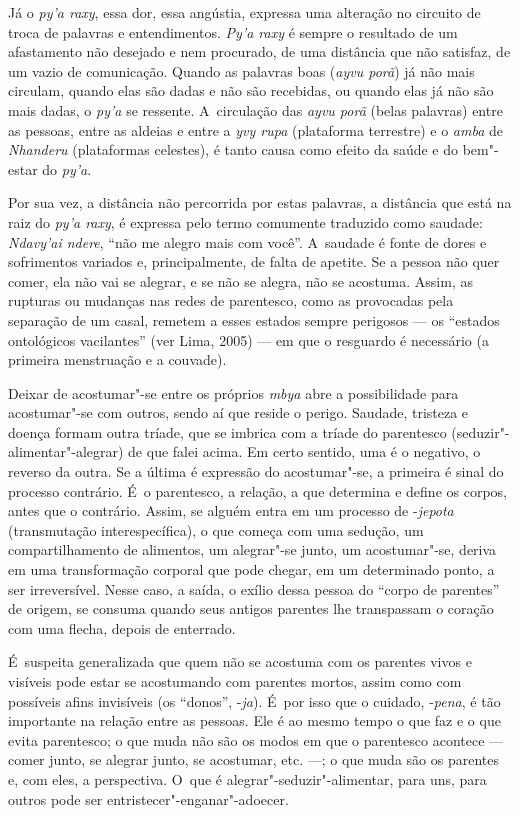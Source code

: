 Já o \emph{py’a raxy}, essa dor, essa angústia, expressa uma alteração no
circuito de troca de palavras e entendimentos. \emph{Py’a raxy} é sempre o
resultado de um afastamento não desejado e nem procurado, de uma
distância que não satisfaz, de um vazio de comunicação. Quando as
palavras boas (\emph{ayvu porã}) já não mais circulam, quando elas são dadas e
não são recebidas, ou quando elas já não são mais dadas, o \emph{py’a} se
ressente. A~circulação das \emph{ayvu porã} (belas palavras) entre as pessoas,
entre as aldeias e entre a \emph{yvy rupa} (plataforma terrestre) e o \emph{amba} de
\emph{Nhanderu} (plataformas celestes), é tanto causa como efeito da saúde e
do bem"-estar do \emph{py’a}.

Por sua vez, a distância não percorrida por estas palavras, a distância
que está na raiz do \emph{py’a raxy}, é expressa pelo termo comumente
traduzido como saudade: \emph{Ndavy’ai ndere}, ``não me alegro mais com
você''. A~saudade é fonte de dores e sofrimentos variados e,
principalmente, de falta de apetite. Se a pessoa não quer comer, ela
não vai se alegrar, e se não se alegra, não se acostuma. Assim, as
rupturas ou mudanças nas redes de parentesco, como as provocadas pela
separação de um casal, remetem a esses estados sempre perigosos --- os
``estados ontológicos vacilantes'' (ver Lima, 2005) --- em que o resguardo
é necessário (a primeira menstruação e a couvade). 

Deixar de acostumar"-se entre os próprios \emph{mbya} abre a possibilidade para
acostumar"-se com outros, sendo aí que reside o perigo. Saudade,
tristeza e doença formam outra tríade, que se imbrica com a tríade do
parentesco (seduzir"-alimentar"-alegrar) de que falei acima. Em certo
sentido, uma é o negativo, o reverso da outra. Se a última é expressão
do acostumar"-se, a primeira é sinal do processo contrário. É~o
parentesco, a relação, a que determina e define os corpos, antes que o
contrário. Assim, se alguém entra em um processo de -\emph{jepota}
(transmutação interespecífica), o que começa com uma sedução, um
compartilhamento de alimentos, um alegrar"-se junto, um acostumar"-se,
deriva em uma transformação corporal que pode chegar, em um determinado
ponto, a ser irreversível. Nesse caso, a saída, o exílio dessa pessoa
do ``corpo de parentes'' de origem, se consuma quando seus antigos
parentes lhe transpassam o coração com uma flecha, depois de
enterrado. 

É~suspeita generalizada que quem não se acostuma com os parentes vivos e
visíveis pode estar se acostumando com parentes mortos, assim como com
possíveis afins invisíveis (os ``donos'', -\emph{ja}). É~por isso que o cuidado,
-\emph{pena}, é tão importante na relação entre as pessoas. Ele é ao mesmo
tempo o que faz e o que evita parentesco; o que muda não são os modos
em que o parentesco acontece --- comer junto, se alegrar junto, se
acostumar, etc. ---; o que muda são os parentes e, com eles, a
perspectiva. O~que é alegrar"-seduzir"-alimentar, para uns, para outros
pode ser entristecer"-enganar"-adoecer. 

